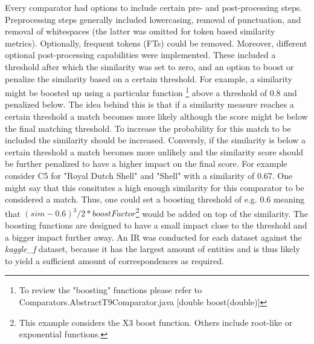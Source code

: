 \documentclass[11pt,titlepage,oneside,openany]{article}
\begin{document}
 Every comparator had options to include certain pre- and post-processing steps. Preprocessing steps generally included lowercasing, removal of punctuation, and removal of whitespaces (the latter was omitted for token based similarity metrics). Optionally, frequent tokens (FTs) could be removed. Moreover, different optional post-processing capabilities were implemented. These included a threshold after which the similarity was set to zero, and an option to boost or penalize the similarity based on a certain threshold. For example, a similarity might be boosted up using a particular function%
\footnote{To review the "boosting" functions please refer to Comparators.AbstractT9Comparator.java [double boost(double)]}%
 above a threshold of 0.8 and penalized below. The idea behind this is that if a similarity measure reaches a certain threshold a match becomes more likely although the score might be below the final matching threshold. To increase the probability for this match to be included the similarity should be increased. Conversly, if the similarity is below a certain threshold a match becomes more unlikely and the similarity score should be further penalized to have a higher impact on the final score. For example consider C5 for "Royal Dutch Shell" and "Shell" with a similarity of 0.67. One might say that this consitutes a high enough similarity for this comparator to be considered a match. Thus, one could set a boosting threshold of e.g. 0.6 meaning that $(sim - 0.6)^3/2*boostFactor$\footnote{This example considers the X3 boost function. Others include root-like or exponential functions.} would be added on top of the similarity. The boosting functions are designed to have a small impact close to the threshold and a bigger impact further away. 
An IR was conducted for each dataset against the \textit{kaggle\_f} dataset, because it has the largest amount of entities and is thus likely to yield a sufficient amount of correspondences as required.
\end{document}
